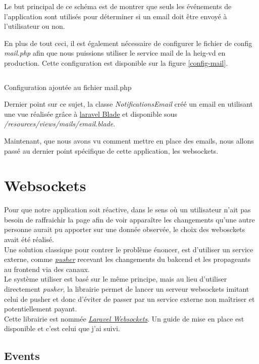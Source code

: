 \documentclass[
    iai, %
    il, %
]{heig-tb}
\begin{document}
Le but principal de ce schéma est de montrer que seuls les événements de l'application sont utilisés pour déterminer si un email doit être envoyé à l'utilisateur ou non.

En plus de tout ceci, il est également nécessaire de configurer le fichier de config \emph{mail.php} afin que nous puissions utiliser le service mail de la \Gls{heig-vd} en production. Cette configuration est disponible sur la figure \ref{config-mail}.

\begin{listing}[h]
    \inputminted{php}{assets/code/mail.php}
    \caption{Configuration ajoutée au fichier mail.php \label{config-mail}}
\end{listing}

Dernier point sur ce sujet, la classe \emph{NotificationsEmail} créé un email en utilisant une vue réalisée grâce à \href{https://laravel.com/docs/9.x/blade}{\Gls{laravel} Blade} et disponible sous \emph{/resources/views/mails/email.blade}.

Maintenant, que nous avons vu comment mettre en place des emails, nous allons passé au dernier point spécifique de cette application, les \Gls{websockets}.

\section{Websockets}
Pour que notre application soit réactive, dans le sens où un utilisateur n'ait pas besoin de raffraichir la page afin de voir apparaître les changements qu'une autre personne aurait pu apporter sur une donnée observée, le choix des webosckets avait été réalisé. \\
Une solution classique pour contrer le problème énoncer, est d'utiliser un service externe, comme \href{https://pusher.com/}{\emph{pusher}} recevant les changements du bakcend et les propageants au \Gls{frontend} via des canaux. \\
Le système utiliser est basé sur le même principe, mais au lieu d'utiliser directement \emph{pusher}, la librairie permet de lancer un serveur \Gls{websockets} imitant celui de pusher et donc d'éviter de passer par un service externe non maîtriser et potentiellement payant. \\
Cette librairie est nommée \href{https://beyondco.de/docs/laravel-websockets/getting-started/introduction}{\emph{Laravel Websockets}}. Un guide de mise en place est disponible et c'est celui que j'ai suivi.

\subsection{Events}
\end{document}
